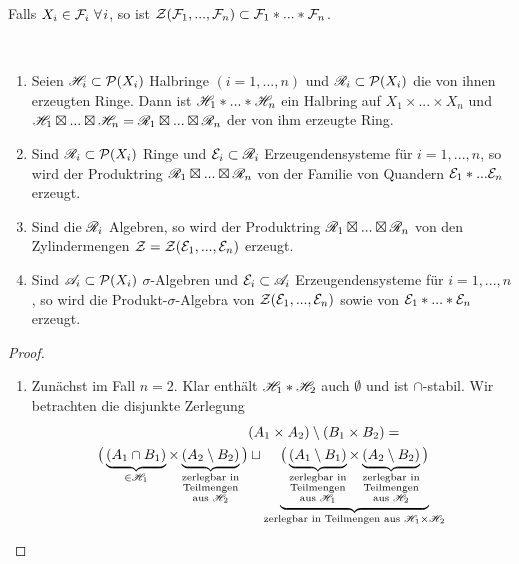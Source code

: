 Falls $X_i \in \FF_i \ \forall i$, so ist $\mathcal{Z}(\mathcal{F}_1,...,\mathcal{F}_n) \subset \mathcal{F}_1 \ast ... \ast \mathcal{F}_n$.%
\begin{proposition}
\begin{mdframed} \
\begin{enumerate}[(\roman*),topsep=5pt, itemsep= 0pt]
	\item Seien $\mathscr{H}_i \subset \mathcal{P}(X_i)$ Halbringe $(i=1,...,n)$ und $\mathscr{R}_i \subset \mathcal{P}(X_i)$ die von ihnen erzeugten Ringe. Dann ist $\mathscr{H}_1 \ast ... \ast \mathscr{H}_n$ ein Halbring auf $X_1 \times ... \times X_n$ und $\mathscr{H}_1 \boxtimes ... \boxtimes \mathscr{H}_n =\mathscr{R}_1 \boxtimes ... \boxtimes \mathscr{R}_n$ der von ihm erzeugte Ring.
	\item Sind $\mathscr{R}_i \subset \mathcal{P}(X_i)$ Ringe und $\mathcal{E}_i \subset \mathscr{R}_i$ Erzeugendensysteme für $i=1,...,n$, so wird der Produktring $\mathscr{R}_1 \boxtimes ... \boxtimes \mathscr{R}_n$ von der Familie von Quandern $\mathcal{E}_1 \ast ... \mathcal{E}_n$ erzeugt.
	\item Sind die $\mathscr{R}_i$ Algebren, so wird der Produktring $\mathscr{R}_1 \boxtimes ... \boxtimes \mathscr{R}_n$ von den Zylindermengen $\mathcal{Z} = \mathcal{Z}(\mathcal{E}_1,...,\mathcal{E}_n)$ erzeugt.
	\item Sind $\mathscr{A}_i \subset \mathcal{P}(X_i)$ $\sigma$-Algebren und $\mathcal{E}_i \subset \mathscr{A}_i$ Erzeugendensysteme für $i=1,...,n$, so wird die Produkt-$\sigma$-Algebra von $\mathcal{Z}(\mathcal{E}_1,...,\mathcal{E}_n)$ sowie von $\mathcal{E}_1 \ast ... \ast \mathcal{E}_n$ erzeugt.
\end{enumerate}
\end{mdframed}
\label{propC}
\begin{proof} \
\begin{enumerate}[(\roman*),topsep=5pt]
	\item Zunächst im Fall $n=2$. Klar enthält $\mathscr{H}_1 \ast \mathscr{H}_2$ auch $\emptyset$ und ist $\cap$-stabil. Wir betrachten die disjunkte Zerlegung
	\begin{equation*}
	\begin{split}
		&(A_1 \times A_2) \setminus (B_1 \times B_2) =\\
	 \big( \underbrace{(A_1 \cap B_1)}_{\in \HH_1} \times \underbrace{(A_2 \setminus B_2)}_{\substack{\text{zerlegbar in} \\ \text{Teilmengen}\\ \text{aus }\HH_2}} \big) & \sqcup \underbrace{\big( \underbrace{(A_1 \setminus B_1)}_{\substack{\text{zerlegbar in} \\ \text{Teilmengen}\\ \text{aus }\HH_1}} \times \underbrace{(A_2 \setminus B_2)}_{\substack{\text{zerlegbar in} \\ \text{Teilmengen}\\ \text{aus }\HH_2}} \big)}_{\text{zerlegbar in Teilmengen aus } \HH_1 \times \HH_2}

\end{split}
\end{equation*}
\end{enumerate}
\end{proof}
\end{proposition}

